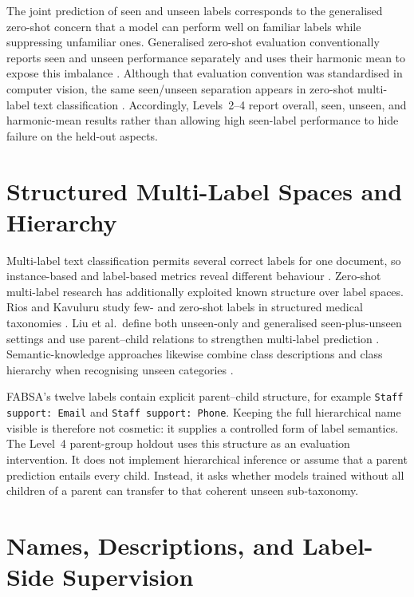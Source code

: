 The joint prediction of seen and unseen labels corresponds to the generalised
zero-shot concern that a model can perform well on familiar labels while
suppressing unfamiliar ones. Generalised zero-shot evaluation conventionally
reports seen and unseen performance separately and uses their harmonic mean to
expose this imbalance \cite{xian2017zsl}. Although that evaluation convention
was standardised in computer vision, the same seen/unseen separation appears
in zero-shot multi-label text classification
\cite{liu2021hierarchy}. Accordingly, Levels~2--4 report overall, seen, unseen,
and harmonic-mean results rather than allowing high seen-label performance to
hide failure on the held-out aspects.

\section{Structured Multi-Label Spaces and Hierarchy}

Multi-label text classification permits several correct labels for one
document, so instance-based and label-based metrics reveal different behaviour
\cite{tsoumakas2007multilabel,zhang2014review}. Zero-shot multi-label research
has additionally exploited known structure over label spaces. Rios and Kavuluru
study few- and zero-shot labels in structured medical taxonomies
\cite{rios2018structured}. Liu et al.\ define both unseen-only and generalised
seen-plus-unseen settings and use parent--child relations to strengthen
multi-label prediction \cite{liu2021hierarchy}. Semantic-knowledge approaches
likewise combine class descriptions and class hierarchy when recognising
unseen categories \cite{zhang2019semantic}.

FABSA's twelve labels contain explicit parent--child structure, for example
\texttt{Staff support: Email} and \texttt{Staff support: Phone}. Keeping the
full hierarchical name visible is therefore not cosmetic: it supplies a
controlled form of label semantics. The Level~4 parent-group holdout uses this
structure as an evaluation intervention. It does not implement hierarchical
inference or assume that a parent prediction entails every child. Instead, it
asks whether models trained without all children of a parent can transfer to
that coherent unseen sub-taxonomy.

\section{Names, Descriptions, and Label-Side Supervision}

